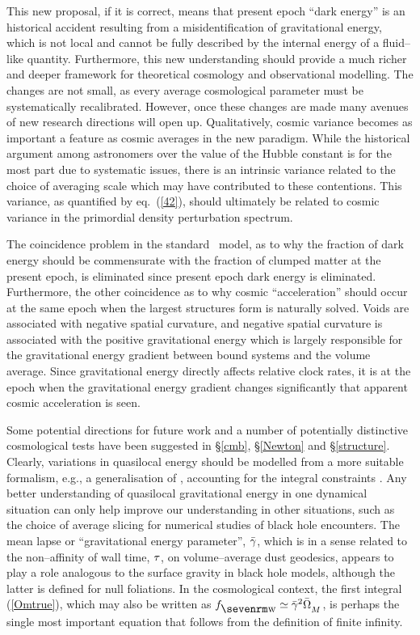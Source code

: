 \documentclass[12pt]{article}
\begin{document}
This new proposal, if it is correct, means that present epoch ``dark energy''
is an historical accident resulting from a misidentification of gravitational
energy, which is not local and cannot be fully described by the
internal energy of a fluid--like quantity.
Furthermore, this new understanding should provide
a much richer and deeper framework for theoretical cosmology and observational
modelling. The changes are not small, as every average cosmological parameter
must be systematically recalibrated. However, once these changes are made
many avenues of new research directions will open up. Qualitatively,
cosmic variance becomes as important a feature as cosmic averages in the new
paradigm. While the historical argument among astronomers over the value of
the Hubble constant is for the most part due to systematic issues, there
is an intrinsic variance related to the choice of averaging scale which may
have contributed to these contentions. This variance, as quantified by
eq.\ (\ref{42}), should ultimately be related to cosmic variance in the
primordial density perturbation spectrum.

The coincidence problem in the standard \LCDM\ model, as to why the fraction
of dark energy should be commensurate with the fraction of clumped
matter at the present epoch, is eliminated since present epoch dark energy
is eliminated. Furthermore, the other coincidence as to why cosmic
``acceleration'' should occur at the same epoch when the largest structures
form is naturally solved. Voids are associated with negative spatial
curvature, and negative spatial curvature is associated with the positive
gravitational energy which is largely responsible for the gravitational
energy gradient between bound systems and the volume average. Since
gravitational energy directly affects relative clock rates, it is at the
epoch when the gravitational energy gradient changes significantly that
apparent cosmic acceleration is seen.

Some potential directions for future work and a number of potentially
distinctive cosmological tests have been suggested in \S\ref{cmb},
\S\ref{Newton} and \S\ref{structure}. Clearly, variations in quasilocal energy
should be modelled from a more suitable formalism, e.g., a generalisation of
\cite{KLB,quasi1,quasi2}, accounting for the integral constraints
\cite{Traschen1,Mach1,Traschen2}.
Any better understanding of quasilocal gravitational energy in one dynamical
situation can only help improve our understanding in other situations,
such as the choice of average slicing for numerical studies of black hole
encounters. The mean lapse or ``gravitational energy parameter'', $\gb$,
which is in a sense related to the non--affinity of wall time, $\tau$, on
volume--average dust geodesics, appears to play a role analogous to the
surface gravity in black hole models, although the latter is
defined for null foliations. In the cosmological context, the first integral
(\ref{Omtrue}), which may also be written as $\fw\simeq\gb^2\OMM$, is perhaps
the single most important equation that follows from the definition of finite
infinity.
\end{document}
